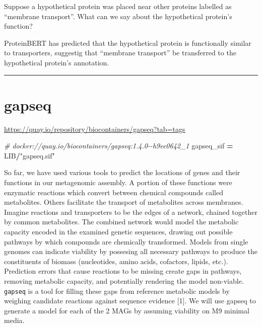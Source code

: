 \documentclass[
]{book}
\newenvironment{Shaded}{\begin{snugshade}}{\end{snugshade}}
\newcommand{\CommentTok}[1]{\textcolor[rgb]{0.56,0.35,0.01}{\textit{#1}}}
\newcommand{\NormalTok}[1]{#1}
\newcommand{\OperatorTok}[1]{\textcolor[rgb]{0.81,0.36,0.00}{\textbf{#1}}}
\newcommand{\StringTok}[1]{\textcolor[rgb]{0.31,0.60,0.02}{#1}}
\begin{document}
Suppose a hypothetical protein was placed near other proteins labelled as ``membrane transport''.
What can we say about the hypothetical protein's function?

ProteinBERT has predicted that the hypothetical protein is functionally similar to transporters, suggestig that ``membrane transport''
be transferred to the hypothetical protein's annotation.

\begin{center}\rule{0.5\linewidth}{0.5pt}\end{center}

\section{gapseq}\label{gapseq}

\url{https://quay.io/repository/biocontainers/gapseq?tab=tags}

\begin{Shaded}
\begin{Highlighting}[numbers=left,,]
\CommentTok{\# docker://quay.io/biocontainers/gapseq:1.4.0{-}{-}h9ee0642\_1}
\NormalTok{gapseq\_sif }\OperatorTok{=}\NormalTok{ LIB}\OperatorTok{/}\StringTok{"gapseq.sif"}
\end{Highlighting}
\end{Shaded}

So far, we have used various tools to predict the locations of genes and their functions in our metagenomic assembly.
A portion of these functions were enzymatic reactions which convert between chemical compounds called metabolites.
Others facilitate the transport of metabolites across membranes. Imagine reactions and transporters to be the edges of a network,
chained together by common metabolites. The combined network would model the metabolic capacity encoded in the examined genetic sequences,
drawing out possible pathways by which compounds are chemically transformed. Models from single genomes can indicate viability
by possesing all necessary pathways to produce the constituents of biomass (nucleotides, amino acids, cofactors, lipids, etc.).
Prediction errors that cause reactions to be missing create gaps in pathways, removing metabolic capacity, and potentially rendering
the model non-viable. \texttt{gapseq} is a tool for filling these gaps from reference metabolic models by weighing candidate reactions
against sequence evidence {[}1{]}. We will use gapseq to generate a model for each of the 2 MAGs by assuming viability on M9 minimal media.
\end{document}
